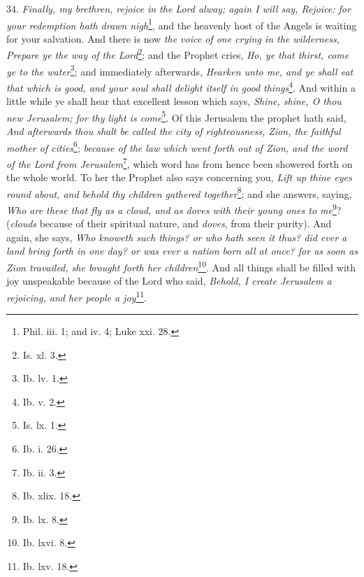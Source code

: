 34. \emph{Finally, my brethren, rejoice in the Lord alway; again I will say, Rejoice: for your redemption hath drawn nigh}\footnote{Phil. iii. 1; and iv. 4; Luke xxi. 28.}, and the heavenly host of the Angels is waiting for your salvation. And there is now \emph{the voice of one crying in the wilderness, Prepare ye the way of the Lord}\footnote{Is. xl. 3.}; and the Prophet cries, \emph{Ho, ye that thirst, come ye to the water}\footnote{Ib. lv. 1.}; and immediately afterwards, \emph{Hearken unto me, and ye shall eat that which is good, and your soul shall delight itself in good things}\footnote{Ib. v. 2.}. And within a little while ye shall hear that excellent lesson which says, \emph{Shine, shine, O thou new Jerusalem; for thy light is come}\footnote{Is. lx. 1.}. Of this Jerusalem the prophet hath said, \emph{And afterwards thou shalt be called the city of righteousness, Zion, the faithful mother of cities}\footnote{Ib. i. 26.}; \emph{because of the law which went forth out of Zion, and the word of the Lord from Jerusalem}\footnote{Ib. ii. 3.}, which word has from hence been showered forth on the whole world. To her the Prophet also says concerning you, \emph{Lift up thine eyes round about, and behold thy children gathered together}\footnote{Ib. xlix. 18.}; and she answers, saying, \emph{Who are these that fly as a cloud, and as doves with their young ones to me}\footnote{Ib. lx. 8.}? (\emph{clouds} because of their spiritual nature, and \emph{doves}, from their purity). And again, she says, \emph{Who knoweth such things? or who hath seen it thus? did ever a land bring forth in one day? or was ever a nation born all at once? for as soon as Zion travailed, she brought forth her children}\footnote{Ib. lxvi. 8.}. And all things shall be filled with joy unspeakable because of the Lord who said, \emph{Behold, I create Jerusalem a rejoicing, and her people a joy}\footnote{Ib. lxv. 18.}.

